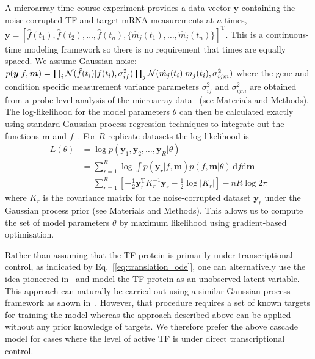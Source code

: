 \documentclass{pnastwo}
\begin{document}
\begin{article}
A microarray time course experiment provides a data vector $\bm y$ containing the noise-corrupted TF and target mRNA
measurements at $n$ times,
$\bm
y=[\hat{f}(t_1),\hat{f}(t_2),\ldots,\hat{f}(t_n),\{\hat{m}_j(t_1),\ldots,\hat{m}_j(t_n)\}]^\mathrm{T}$. This
is a continuous-time modeling framework so there is no
requirement that times are equally spaced. We assume Gaussian noise:
$p(\bm y|f,\bm m)=\prod_i{\cal
  N}(\hat{f}(t_i)|f(t_i),\sigma_{if}^2)\prod_j{\cal
  N}(\hat{m_j}(t_i)|m_j(t_i),\sigma_{ijm}^2)$ where the gene and condition
specific measurement variance parameters $\sigma_{if}^2$ and
$\sigma_{ijm}^2$ are obtained from a probe-level analysis of the
microarray data~\cite{Liu2005,Pearson2009} (see
Materials and Methods). The log-likelihood for the model parameters
$\theta$ can then be calculated exactly using standard Gaussian process regression
techniques to integrate out the functions $\bm m$ and
$f$~\cite{Rasmussen2006}. For $R$ replicate datasets the
log-likelihood is
\begin{equation*}
  \begin{split}
    L(\theta) & = \log p(\bm y_1,\bm y_2,\ldots,\bm y_{R}|\theta) \\
    & = \sum_{r=1}^{R} \log \!\int 
    \!\!p(\bm y_r|f,\bm m)p(f,\bm m|\theta) \, \mathrm{d}\!f\mathrm{d}\bm m\\
    & = \sum_{r=1}^{R} \left[-\frac{1}{2}\bm y_r^\mathrm{T} K_r^{-1} \bm y_r -
      \frac{1}{2}\log|K_r|\right] -nR\log 2\pi
  \end{split}
\end{equation*}
where $K_r$ is the covariance matrix for the
noise-corrupted dataset $\bm y_r$ under the Gaussian process prior (see
Materials and Methods). This allows us to compute the set of model
parameters $\theta$ by maximum
likelihood using gradient-based optimisation. 

Rather than assuming that the TF protein is primarily under
transcriptional control, as indicated by
Eq.~[\ref{eq:translation_ode}], one can alternatively use the idea pioneered
in~\cite{Barenco2006a} and model the TF protein as an unobserved
latent variable. This approach can naturally be carried out using a
similar Gaussian process framework as shown in~\cite{Gao2008}. However, that procedure requires a set of known
targets for training the model whereas the approach described above
can be applied without any prior knowledge of targets. We therefore
prefer the above cascade model for cases where the level of active TF is under direct transcriptional control. 


\end{article}
\end{document}
